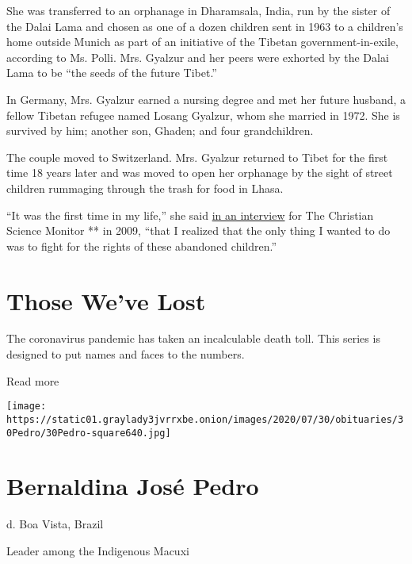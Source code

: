She was transferred to an orphanage in Dharamsala, India, run by the
sister of the Dalai Lama and chosen as one of a dozen children sent in
1963 to a children's home outside Munich as part of an initiative of the
Tibetan government-in-exile, according to Ms. Polli. Mrs. Gyalzur and
her peers were exhorted by the Dalai Lama to be ``the seeds of the
future Tibet.''

In Germany, Mrs. Gyalzur earned a nursing degree and met her future
husband, a fellow Tibetan refugee named Losang Gyalzur, whom she married
in 1972. She is survived by him; another son, Ghaden; and four
grandchildren.

The couple moved to Switzerland. Mrs. Gyalzur returned to Tibet for the
first time 18 years later and was moved to open her orphanage by the
sight of street children rummaging through the trash for food in Lhasa.

``It was the first time in my life,'' she said
\href{https://www.csmonitor.com/World/Making-a-difference/2009/1019/p07s01-lign.html}{in
an interview} for The Christian Science Monitor ** in 2009, ``that I
realized that the only thing I wanted to do was to fight for the rights
of these abandoned children.''

\href{https://www.nytimes3xbfgragh.onion/interactive/2020/obituaries/people-died-coronavirus-obituaries.html?action=click\&pgtype=Article\&state=default\&region=BELOW_MAIN_CONTENT\&context=covid_obits_promo}{}

\hypertarget{those-weve-lost}{%
\section{Those We've Lost}\label{those-weve-lost}}

The coronavirus pandemic has taken an incalculable death toll. This
series is designed to put names and faces to the numbers.

Read more

\texttt{[image: https://static01.graylady3jvrrxbe.onion/images/2020/07/30/obituaries/30Pedro/30Pedro-square640.jpg]}

\hypertarget{bernaldina-josuxe9-pedro}{%
\section{Bernaldina José Pedro}\label{bernaldina-josuxe9-pedro}}

d. Boa Vista, Brazil

Leader among the Indigenous Macuxi

